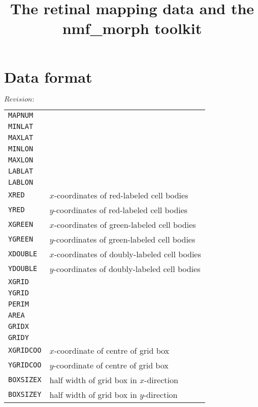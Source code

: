 \documentclass{article}
\title{The retinal mapping data and the nmf\_morph toolkit}
\begin{document}
\maketitle

\section{Data format}
\label{manual:sec:reading-data}

$Revision:$

\begin{table}
  \begin{tabular}{ll}
    \texttt{MAPNUM}   & \\  
    \texttt{MINLAT}   & \\
    \texttt{MAXLAT}   & \\
    \texttt{MINLON}   & \\
    \texttt{MAXLON}   & \\
    \texttt{LABLAT}   & \\
    \texttt{LABLON}   & \\
    \texttt{XRED}     & $x$-coordinates of red-labeled cell bodies    \\
    \texttt{YRED}     & $y$-coordinates of red-labeled cell bodies    \\
    \texttt{XGREEN}   & $x$-coordinates of green-labeled cell bodies  \\
    \texttt{YGREEN}   & $y$-coordinates of green-labeled cell bodies  \\
    \texttt{XDOUBLE}  & $x$-coordinates of doubly-labeled cell bodies \\ 
    \texttt{YDOUBLE}  & $y$-coordinates of doubly-labeled cell bodies \\
    \texttt{XGRID}    & \\
    \texttt{YGRID}    & \\
    \texttt{PERIM}    & \\
    \texttt{AREA}     & \\
    \texttt{GRIDX}    & \\
    \texttt{GRIDY}    & \\
    \texttt{XGRIDCOO} & $x$-coordinate of centre of grid box \\
    \texttt{YGRIDCOO} & $y$-coordinate of centre of grid box \\
    \texttt{BOXSIZEX} & half width of grid box in $x$-direction \\
    \texttt{BOXSIZEY} & half width of grid box in $y$-direction \\

\end{tabular}
\end{table}
\end{document}

